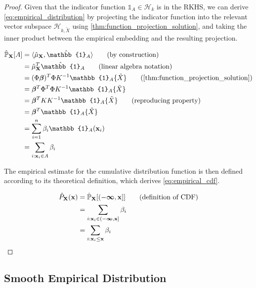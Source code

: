 \documentclass[twoside]{article} \usepackage{aistats2017}
\theoremstyle{definition}
\theoremstyle{theorem}
\newcommand{\rv}[1]{{#1}}
\newcommand{\ds}[1]{\tilde{#1}}
\newcommand{\inner}[2]{{\langle #1, #2 \rangle}}
\begin{document}
		\begin{proof}
			Given that the indicator function $\mathbb{1}_{A} \in \mathcal{H}_{k}$ is in the RKHS, we can derive \eqref{eq:empirical_distribution} by projecting the indicator function into the relevant vector subspace $\mathcal{H}_{k, \ds{X}}$ using \cref{thm:function_projection_solution}, and taking the inner product between the empirical embedding and the resulting projection. 

			\begin{align*}
				\hat{\mathbb{P}}_{\bvec{\rv{X}}}[A] &= \inner{\hat{\mu}_{\bvec{\rv{X}}}}{ \hat{\mathbb{1}}_{A}} \tag{by construction} \\
				&= \hat{\mu}_{\bvec{\rv{X}}}^{T}\hat{\mathbb{1}}_{A} \tag{linear algebra notation} \\
				&= (\Phi \bm{\beta})^{T} \Phi K^{-1} \mathbb{1}_{A}\{\ds{X}\} \tag{\cref{thm:function_projection_solution}} \\
				&= \bm{\beta}^{T} \Phi^{T} \Phi K^{-1} \mathbb{1}_{A}\{\ds{X}\} \\
				&= \bm{\beta}^{T} K K^{-1} \mathbb{1}_{A}\{\ds{X}\} \tag{reproducing property} \\
				&= \bm{\beta}^{T} \mathbb{1}_{A}\{\ds{X}\} \\
				&= \sum_{i = 1}^{n} \beta_{i} \mathbb{1}_{A}(\bvec{x}_{i}) \\
				&= \sum_{i : \bvec{x}_{i} \in A} \beta_{i}
			\end{align*}

			The empirical estimate for the cumulative distribution function is then defined according to its theoretical definition, which derives \eqref{eq:empirical_cdf}.

			\begin{align*}
				\hat{P}_{\bvec{\rv{X}}}(\bvec{x}) &= \hat{\mathbb{P}}_{\bvec{\rv{X}}}[(-\bm{\infty}, \bvec{x}]] \tag{definition of CDF} \\
				&= \sum_{i : \bvec{x}_{i} \in (-\bm{\infty}, \bvec{x}]} \beta_{i} \\
				&= \sum_{i : \bvec{x}_{i} \leq \bvec{x}} \beta_{i}
			\end{align*}
		\end{proof}
		
	\subsection{Smooth Empirical Distribution}
	\label{sec:direct_quantile_regression:smooth_empirical_distribution}
		
\end{document}
